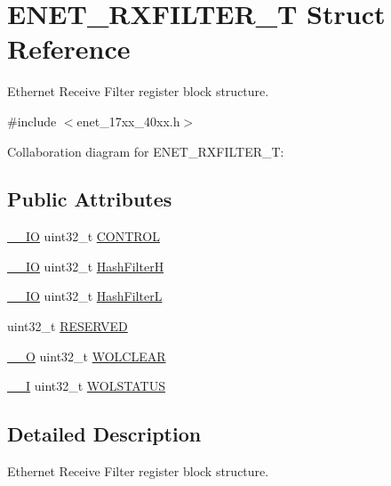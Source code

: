 \hypertarget{structENET__RXFILTER__T}{}\section{E\+N\+E\+T\+\_\+\+R\+X\+F\+I\+L\+T\+E\+R\+\_\+T Struct Reference}
\label{structENET__RXFILTER__T}


Ethernet Receive Filter register block structure.  




{\ttfamily \#include $<$enet\+\_\+17xx\+\_\+40xx.\+h$>$}



Collaboration diagram for E\+N\+E\+T\+\_\+\+R\+X\+F\+I\+L\+T\+E\+R\+\_\+T\+:
\subsection*{Public Attributes}
\begin{DoxyCompactItemize}
\item 
\hyperlink{core__cm3_8h_aec43007d9998a0a0e01faede4133d6be}{\+\_\+\+\_\+\+IO} uint32\+\_\+t \hyperlink{structENET__RXFILTER__T_a41f07a3db2876b8d2ad5da9a93dfc26b}{C\+O\+N\+T\+R\+OL}
\item 
\hyperlink{core__cm3_8h_aec43007d9998a0a0e01faede4133d6be}{\+\_\+\+\_\+\+IO} uint32\+\_\+t \hyperlink{structENET__RXFILTER__T_a2d82ff2319b5b50a63698fd062c2fe7d}{Hash\+FilterH}
\item 
\hyperlink{core__cm3_8h_aec43007d9998a0a0e01faede4133d6be}{\+\_\+\+\_\+\+IO} uint32\+\_\+t \hyperlink{structENET__RXFILTER__T_ad011f3c2f5381b81e57c42420bb98644}{Hash\+FilterL}
\item 
uint32\+\_\+t \hyperlink{structENET__RXFILTER__T_a519bb4adc188b23217e7c6e41e2e0ea8}{R\+E\+S\+E\+R\+V\+ED}
\item 
\hyperlink{core__cm3_8h_a7e25d9380f9ef903923964322e71f2f6}{\+\_\+\+\_\+O} uint32\+\_\+t \hyperlink{structENET__RXFILTER__T_acc4b5d489de8f522d567436de4b10d91}{W\+O\+L\+C\+L\+E\+AR}
\item 
\hyperlink{core__cm3_8h_af63697ed9952cc71e1225efe205f6cd3}{\+\_\+\+\_\+I} uint32\+\_\+t \hyperlink{structENET__RXFILTER__T_a40eedf8542d1e384d39cc5fca3fffffb}{W\+O\+L\+S\+T\+A\+T\+US}
\end{DoxyCompactItemize}


\subsection{Detailed Description}
Ethernet Receive Filter register block structure. 

